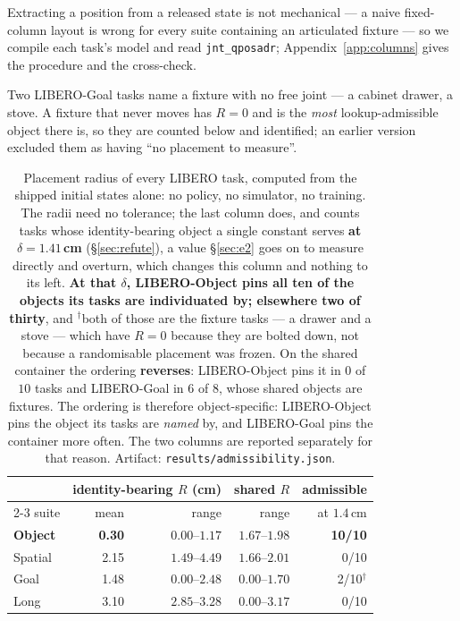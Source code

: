 \documentclass[10pt,twocolumn]{article}
\begin{document}
Extracting a position from a released state is not mechanical --- a naive
fixed-column layout is wrong for every suite containing an articulated fixture
--- so we compile each task's model and read \texttt{jnt\_qposadr};
Appendix~\ref{app:columns} gives the procedure and the cross-check.

Two LIBERO-Goal tasks name a fixture with no free joint --- a cabinet drawer, a
stove. A fixture that never moves has $R = 0$ and is the \emph{most}
lookup-admissible object there is, so they are counted below and identified; an
earlier version excluded them as having ``no placement to measure''.

\begin{table}[t]\centering\footnotesize
\setlength{\tabcolsep}{3.5pt}
\begin{tabular}{lrrrr}
\toprule
 & \multicolumn{2}{c}{identity-bearing $R$ (cm)} & shared $R$ & admissible \\
\cmidrule(lr){2-3}
suite & mean & range & range & at $1.4$\,cm \\
\midrule
\textbf{Object} & \textbf{0.30} & $0.00$--$\mathbf{1.17}$ & $1.67$--$1.98$ & \textbf{10/10} \\
Spatial & 2.15 & $1.49$--$4.49$ & $1.66$--$2.01$ & 0/10 \\
Goal & 1.48 & $0.00$--$2.48$ & $0.00$--$1.70$ & 2/10$^\dagger$ \\
Long & 3.10 & $2.85$--$3.28$ & $0.00$--$3.17$ & 0/10 \\
\bottomrule
\end{tabular}
\caption{Placement radius of every LIBERO task, computed from the shipped
initial states alone: no policy, no simulator, no training. The radii need no tolerance; the last
column does, and counts tasks whose identity-bearing object a single constant
serves \textbf{at $\delta = 1.41$\,cm} (\S\ref{sec:refute}), a value
\S\ref{sec:e2} goes on to measure directly and overturn, which changes this
column and nothing to its left.
\textbf{At that $\delta$, LIBERO-Object pins all ten of the objects its tasks
are individuated by; elsewhere two of thirty}, and $^\dagger$both of those are
the fixture tasks
--- a drawer and a stove --- which have $R = 0$ because they are bolted down,
not because a randomisable placement was frozen. On the shared container the ordering
\textbf{reverses}: LIBERO-Object pins it in $0$ of $10$ tasks and LIBERO-Goal
in $6$ of $8$, whose shared objects are fixtures. The ordering is therefore
object-specific: LIBERO-Object pins the object its tasks are \emph{named} by,
and LIBERO-Goal pins the container more often. The two columns are reported
separately for that reason. Artifact:
\texttt{results/admissibility.json}.}
\label{tab:suites}
\end{table}
\end{document}
